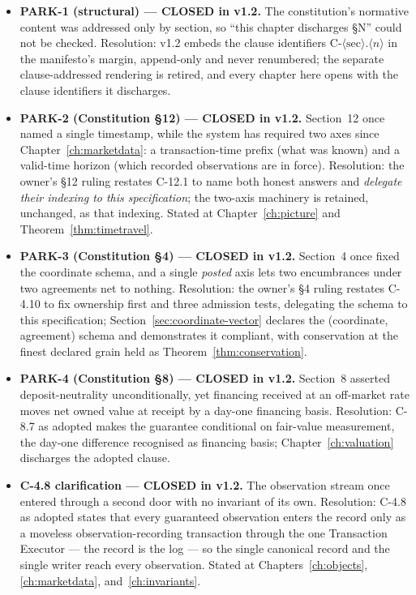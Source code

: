 \begin{itemize}
\item \textbf{PARK-1 (structural) --- CLOSED in v1.2.} The constitution's normative content
  was addressed only by section, so ``this chapter discharges \S N'' could not be checked.
  Resolution: v1.2 embeds the clause identifiers
  $\mathrm{C}\text{-}\langle\text{sec}\rangle.\langle n\rangle$ in the manifesto's margin,
  append-only and never renumbered; the separate clause-addressed rendering is retired, and
  every chapter here opens with the clause identifiers it discharges.
\item \textbf{PARK-2 (Constitution \S12) --- CLOSED in v1.2.} Section~12 once named a single
  timestamp, while the system has required two axes since Chapter~\ref{ch:marketdata}: a
  transaction-time prefix (what was known) and a valid-time horizon (which recorded
  observations are in force). Resolution: the owner's \S 12 ruling restates C-12.1 to name
  both honest answers and \emph{delegate their indexing to this specification}; the two-axis
  machinery is retained, unchanged, as that indexing. Stated at Chapter~\ref{ch:picture} and
  Theorem~\ref{thm:timetravel}.
\item \textbf{PARK-3 (Constitution \S4) --- CLOSED in v1.2.} Section~4 once fixed the
  coordinate schema, and a single \emph{posted} axis lets two encumbrances under two
  agreements net to nothing. Resolution: the owner's \S 4 ruling restates C-4.10 to fix
  ownership first and three admission tests, delegating the schema to this specification;
  Section~\ref{sec:coordinate-vector} declares the (coordinate, agreement) schema and
  demonstrates it compliant, with conservation at the finest declared grain held as
  Theorem~\ref{thm:conservation}.
\item \textbf{PARK-4 (Constitution \S8) --- CLOSED in v1.2.} Section~8 asserted
  deposit-neutrality unconditionally, yet financing received at an off-market rate moves net
  owned value at receipt by a day-one financing basis. Resolution: C-8.7 as adopted makes the
  guarantee conditional on fair-value measurement, the day-one difference recognised as
  financing basis; Chapter~\ref{ch:valuation} discharges the adopted clause.
\item \textbf{C-4.8 clarification --- CLOSED in v1.2.} The observation stream once entered
  through a second door with no invariant of its own. Resolution: C-4.8 as adopted states
  that every guaranteed observation enters the record only as a moveless
  observation-recording transaction through the one Transaction Executor --- the record is
  the log --- so the single canonical record and the single writer reach every observation.
  Stated at Chapters~\ref{ch:objects}, \ref{ch:marketdata}, and~\ref{ch:invariants}.
\end{itemize}

